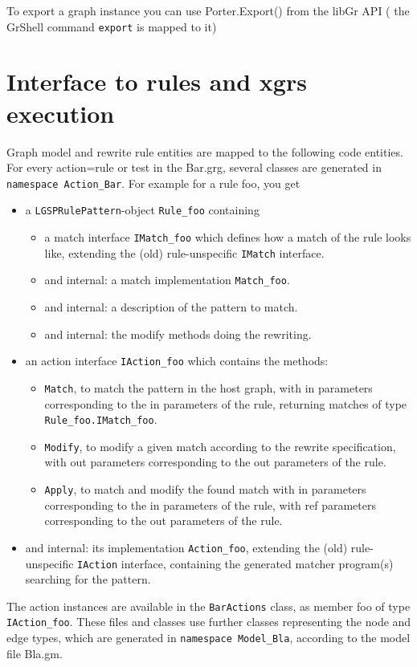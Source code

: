 To export a graph instance you can use Porter.Export() from the libGr API (
the GrShell command \verb#export# is mapped to it)


\section{Interface to rules and xgrs execution}

Graph model and rewrite rule entities are mapped to the following code entities.
For every action=rule or test in the Bar.grg, 
several classes are generated in \verb#namespace Action_Bar#.
For example for a rule foo, you get
\begin{itemize}
\item a \verb#LGSPRulePattern#-object \verb#Rule_foo# containing
  \begin{itemize}
  \item a match interface \verb#IMatch_foo# which defines how a match of the rule looks like, extending the (old) rule-unspecific \verb#IMatch# interface.
  \item and internal: a match implementation \verb#Match_foo#.
  \item and internal: a description of the pattern to match.
  \item and internal: the modify methods doing the rewriting.
  \end{itemize}
\item an action interface \verb#IAction_foo# which contains the methods:
  \begin{itemize}
  \item \verb#Match#, to match the pattern in the host graph,
     with in parameters corresponding to the in parameters of the rule,
	 returning matches of type \verb#Rule_foo.IMatch_foo#.
  \item \verb#Modify#, to modify a given match according to the rewrite specification,
     with out parameters corresponding to the out parameters of the rule.
  \item \verb#Apply#, to match and modify the found match 
     with in parameters corresponding to the in parameters of the rule,
     with ref parameters corresponding to the out parameters of the rule.
   \end{itemize}
\item and internal: its implementation \verb#Action_foo#,
   extending the (old) rule-unspecific \verb#IAction# interface,
   containing the generated matcher program(s) searching for the pattern.
\end{itemize}
The action instances are available in the \verb#BarActions# class,
  as member foo of type \verb#IAction_foo#.
These files and classes use further classes representing the node and edge types,
which are generated in \verb#namespace Model_Bla#, according to the model file Bla.gm.

